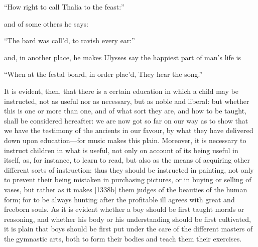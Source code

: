 ``How right to call Thalia to the feast:''

and of some others he says:

``The bard was call'd, to ravish every ear:''

and, in another place, he makes Ulysses say the happiest part of man's
life is

``When at the festal board, in order plac'd, They hear the song.''

It is evident, then, that there is a certain education in which a child
may be instructed, not as useful nor as necessary, but as noble and
liberal: but whether this is one or more than one, and of what sort they
are, and how to be taught, shall be considered hereafter: we are now got
so far on our way as to show that we have the testimony of the ancients in
our favour, by what they have delivered down upon education—for
music makes this plain. Moreover, it is necessary to instruct children in
what is useful, not only on account of its being useful in itself, as, for
instance, to learn to read, but also as the means of acquiring other
different sorts of instruction: thus they should be instructed in
painting, not only to prevent their being mistaken in purchasing pictures,
or in buying or selling of vases, but rather as it makes [1338b] them
judges of the beauties of the human form; for to be always hunting after
the profitable ill agrees with great and freeborn souls. As it is evident
whether a boy should be first taught morals or reasoning, and whether his
body or his understanding should be first cultivated, it is plain that
boys should be first put under the care of the different masters of the
gymnastic arts, both to form their bodies and teach them their exercises.


